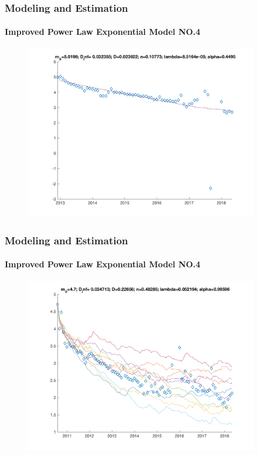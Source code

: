 \documentclass[11pt]{beamer}
\begin{document}
\begin{frame}
	\frametitle{Modeling and Estimation}
	\framesubtitle{Improved Power Law Exponential Model NO.4}
	\justifying
	\begin{figure}
		\begin{center}
			\includegraphics[width=0.9\textwidth  ]{AAplot_21} 
		\end{center}
	\end{figure}				
\end{frame}	


\begin{frame}
	\frametitle{Modeling and Estimation}
	\framesubtitle{Improved Power Law Exponential Model NO.4}
	\justifying
	\begin{figure}
		\begin{center}
			\includegraphics[width=0.9\textwidth  ]{AAplot_27} 
		\end{center}
	\end{figure}				
\end{frame}	
\end{document}
